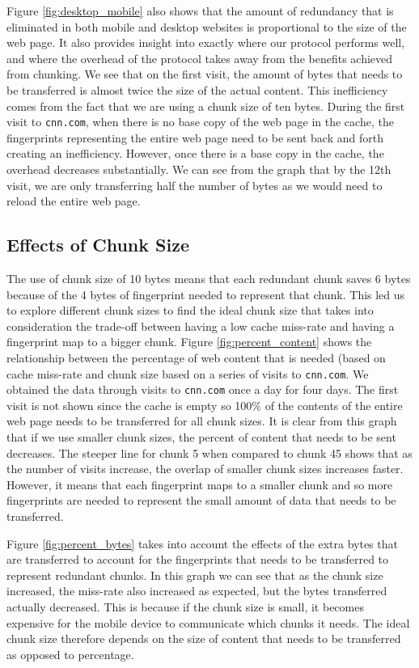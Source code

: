 Figure \ref{fig:desktop_mobile} also shows that the amount of redundancy that is eliminated in both mobile and desktop websites is proportional to the size of the web page. 
It also provides insight into exactly where our protocol performs well, and where the overhead of the protocol takes away from the benefits achieved from chunking. 
We see that on the first visit, the amount of bytes that needs to be transferred is almost twice the size of the actual content. 
This inefficiency comes from the fact that we are using a chunk size of ten bytes. 
During the first visit to \texttt{cnn.com}, when there is no base copy of the web page in the cache, the fingerprints representing the entire web page need to be sent back and forth creating an inefficiency. 
However, once there is a base copy in the cache, the overhead decreases substantially. 
We can see from the graph that by the 12th visit, we are only transferring half the number of bytes as we would need to reload the entire web page. 

\subsection{Effects of Chunk Size}
The use of chunk size of 10 bytes means that each redundant chunk saves 6 bytes because of the 4 bytes of fingerprint needed to represent that chunk. 
This led us to explore different chunk sizes to find the ideal chunk size that takes into consideration the trade-off between having a low cache miss-rate and having a fingerprint map to a bigger chunk.  Figure \ref{fig:percent_content} shows the relationship between the percentage of web content that is needed (based on cache miss-rate and chunk size based on a series of visits to \texttt{cnn.com}. We obtained the data through visits to \texttt{cnn.com} once a day for four days. The first visit is not shown since the cache is empty so 100\% of the contents of the entire web page needs to be transferred for all chunk sizes. 
It is clear from this graph that if we use smaller chunk sizes, the percent of content that needs to be sent decreases. 
The steeper line for chunk 5 when compared to chunk 45 shows that as the number of visits increase, the overlap of smaller chunk sizes increases faster.
However, it means that each fingerprint maps to a smaller chunk and so more fingerprints are needed to represent the small amount of data that needs to be transferred. 

Figure \ref{fig:percent_bytes} takes into account the effects of the extra bytes that are transferred to account for the fingerprints that needs to be transferred to represent redundant chunks. In this graph we can see that as the chunk size increased, the miss-rate also increased as expected, but the bytes transferred actually decreased. 
This is because if the chunk size is small, it becomes expensive for the mobile device to communicate which chunks it needs. 
The ideal chunk size therefore depends on the size of content that needs to be transferred as opposed to percentage.

